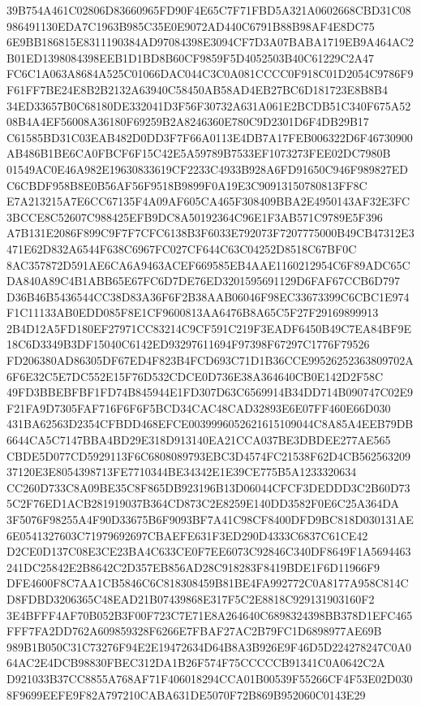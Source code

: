 \documentclass[UTF8,fontset=fandol,zihao=-4,a4paper]{ctexart}
\begin{document}
{{39B754A461C02806D83660965FD90F4E65C7F71FBD5A321A0602668CBD31C08986491130EDA7C1963B985C35E0E9072AD440C6791B88B98AF4E8DC75
6E9BB186815E8311190384AD97084398E3094CF7D3A07BABA1719EB9A464AC2B01ED1398084398EEB1D1BD8B60CF9859F5D4052503B40C61229C2A47
FC6C1A063A8684A525C01066DAC044C3C0A081CCCC0F918C01D2054C9786F9F61FF7BE24E8B2B2132A63940C58450AB58AD4EB27BC6D181723E8B8B4
34ED33657B0C68180DE332041D3F56F30732A631A061E2BCDB51C340F675A5208B4A4EF56008A36180F69259B2A8246360E780C9D2301D6F4DB29B17
C61585BD31C03EAB482D0DD3F7F66A0113E4DB7A17FEB006322D6F46730900AB486B1BE6CA0FBCF6F15C42E5A59789B7533EF1073273FEE02DC7980B
01549AC0E46A982E19630833619CF2233C4933B928A6FD91650C946F989827EDC6CBDF958B8E0B56AF56F9518B9899F0A19E3C90913150780813FF8C
E7A213215A7E6CC67135F4A09AF605CA465F308409BBA2E4950143AF32E3FC3BCCE8C52607C988425EFB9DC8A50192364C96E1F3AB571C9789E5F396
A7B131E2086F899C9F7F7CFC6138B3F6033E792073F7207775000B49CB47312E3471E62D832A6544F638C6967FC027CF644C63C04252D8518C67BF0C
8AC357872D591AE6CA6A9463ACEF669585EB4AAE1160212954C6F89ADC65CDA840A89C4B1ABB65E67FC6D7DE76ED3201595691129D6FAF67CCB6D797
D36B46B5436544CC38D83A36F6F2B38AAB06046F98EC33673399C6CBC1E974F1C11133AB0EDD085F8E1CF9600813AA6476B8A65C5F27F29169899913
2B4D12A5FD180EF27971CC83214C9CF591C219F3EADF6450B49C7EA84BF9E18C6D3349B3DF15040C6142ED93297611694F97398F67297C1776F79526
FD206380AD86305DF67ED4F823B4FCD693C71D1B36CCE99526252363809702A6F6E32C5E7DC552E15F76D532CDCE0D736E38A364640CB0E142D2F58C
49FD3BBEBFBF1FD74B845944E1FD307D63C6569914B34DD714B090747C02E9F21FA9D7305FAF716F6F6F5BCD34CAC48CAD32893E6E07FF460E66D030
431BA62563D2354CFBDD468EFCE0039996052621615109044C8A85A4EEB79DB6644CA5C7147BBA4BD29E318D913140EA21CCA037BE3DBDEE277AE565
CBDE5D077CD5929113F6C6808089793EBC3D4574FC21538F62D4CB56256320937120E3E8054398713FE7710344BE34342E1E39CE775B5A1233320634
CC260D733C8A09BE35C8F865DB923196B13D06044CFCF3DEDDD3C2B60D735C2F76ED1ACB281919037B364CD873C2E8259E140DD3582F0E6C25A364DA
3F5076F98255A4F90D33675B6F9093BF7A41C98CF8400DFD9BC818D030131AE6E0541327603C71979692697CBAEFE631F3ED290D4333C6837C61CE42
D2CE0D137C08E3CE23BA4C633CE0F7EE6073C92846C340DF8649F1A5694463241DC25842E2B8642C2D357EB856AD28C918283F8419BDE1F6D11966F9
DFE4600F8C7AA1CB5846C6C818308459B81BE4FA992772C0A8177A958C814CD8FDBD3206365C48EAD21B07439868E317F5C2E8818C929131903160F2
3E4BFFF4AF70B052B3F00F723C7E71E8A264640C6898324398BB378D1EFC465FFF7FA2DD762A609859328F6266E7FBAF27AC2B79FC1D6898977AE69B
989B1B050C31C73276F94E2E19472634D64B8A3B926E9F46D5D224278247C0A064AC2E4DCB98830FBEC312DA1B26F574F75CCCCCB91341C0A0642C2A
D921033B37CC8855A768AF71F406018294CCA01B00539F55266CF4F53E02D0308F9699EEFE9F82A797210CABA631DE5070F72B869B952060C0143E29
}}
\end{document}
